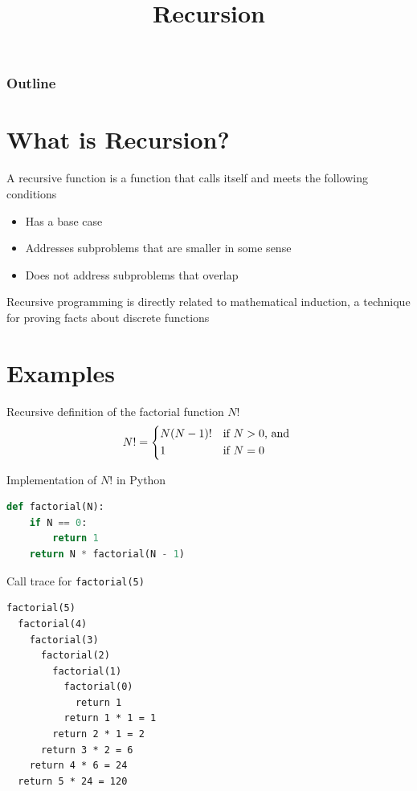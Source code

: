 \documentclass[8pt,a4paper,compress]{beamer}
\title{Recursion}
\date{}
\begin{document}
\begin{frame}
\vfill
\titlepage
\end{frame}

\begin{frame}
\frametitle{Outline}
\tableofcontents
\end{frame}

\section{What is Recursion?}
\begin{frame}[fragile]
\pause

A recursive function is a function that calls itself and meets the following conditions
\begin{itemize}
\item Has a base case
\item Addresses subproblems that are smaller in some sense
\item Does not address subproblems that overlap
\end{itemize}

\pause
\bigskip

Recursive programming is directly related to mathematical induction, a technique for proving facts about discrete functions
\end{frame}

\section{Examples}
\begin{frame}[fragile]
\pause

Recursive definition of the factorial function $N!$ 
\[
N! = \begin{dcases*}
N(N-1)! & if $N > 0$, and \\
1       & if $N=0$
\end{dcases*}
\]

\pause
\bigskip

Implementation of $N!$ in Python

\begin{lstlisting}[language=Python]
def factorial(N):
    if N == 0:
        return 1
    return N * factorial(N - 1)
\end{lstlisting}

\pause
\bigskip

Call trace for \lstinline{factorial(5)}
\begin{lstlisting}[language={}]
factorial(5)
  factorial(4)
    factorial(3)
      factorial(2)
        factorial(1)
          factorial(0)
            return 1
          return 1 * 1 = 1            
        return 2 * 1 = 2
      return 3 * 2 = 6
    return 4 * 6 = 24
  return 5 * 24 = 120
\end{lstlisting}
\end{frame}
\end{document}
